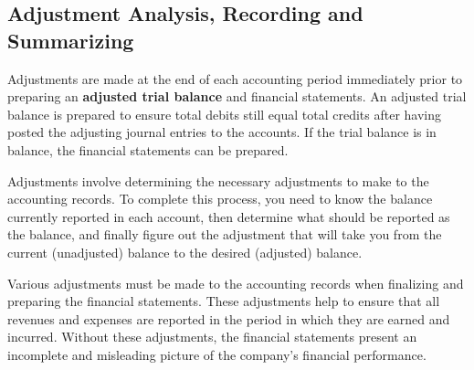 \documentclass[../main.tex]{subfiles}
\begin{document}
	\subsection{Adjustment Analysis, Recording and Summarizing}
	Adjustments are made at the end of each accounting period immediately prior 
	to preparing an \textbf{adjusted trial balance} and financial statements. 
	An adjusted trial balance is prepared to ensure total debits still equal 
	total credits after having posted the adjusting journal entries to the 
	accounts. If the trial balance is in balance, the financial statements can 
	be prepared.
	
	Adjustments involve determining the necessary adjustments to make to the 
	accounting records. To complete this process, you need to know the balance 
	currently reported in each account, then determine what should be reported 
	as the balance, and finally figure out the adjustment that will take you 
	from the current (unadjusted) balance to the desired (adjusted) balance.
	
	Various adjustments must be made to the accounting records when finalizing 
	and preparing the financial statements. These adjustments help to ensure 
	that all revenues and expenses are reported in the period in which they are 
	earned and incurred. Without these adjustments, the financial statements 
	present an incomplete and misleading picture of the company’s financial 
	performance.
	
\end{document}
